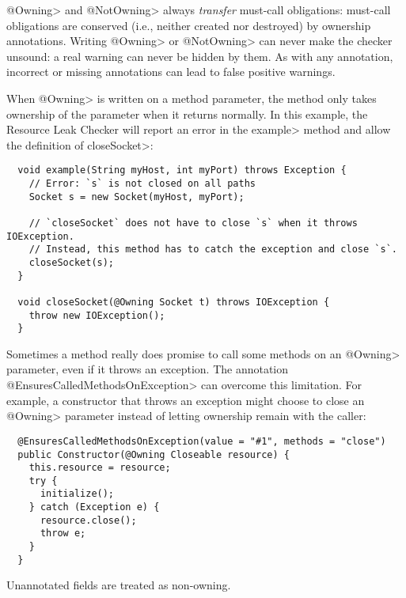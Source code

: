 \<@Owning> and \<@NotOwning> always \emph{transfer} must-call obligations: must-call
obligations are conserved (i.e., neither created nor destroyed) by ownership annotations.
Writing \<@Owning> or \<@NotOwning> can never make the checker
unsound:  a real warning can never be hidden by them.
As with any annotation, incorrect or missing annotations can lead to false positive warnings.


When \<@Owning> is written on a method parameter, the method only takes ownership of the
parameter when it returns normally.  In this example, the Resource Leak Checker will report
an error in the \<example> method and allow the definition of \<closeSocket>:

\begin{verbatim}
  void example(String myHost, int myPort) throws Exception {
    // Error: `s` is not closed on all paths
    Socket s = new Socket(myHost, myPort);

    // `closeSocket` does not have to close `s` when it throws IOException.
    // Instead, this method has to catch the exception and close `s`.
    closeSocket(s);
  }

  void closeSocket(@Owning Socket t) throws IOException {
    throw new IOException();
  }
\end{verbatim}

Sometimes a method really does promise to call some methods on an \<@Owning> parameter,
even if it throws an exception.  The annotation \<@EnsuresCalledMethodsOnException> can
overcome this limitation.  For example, a constructor that throws an exception might
choose to close an \<@Owning> parameter instead of letting ownership remain with the caller:

\begin{verbatim}
  @EnsuresCalledMethodsOnException(value = "#1", methods = "close")
  public Constructor(@Owning Closeable resource) {
    this.resource = resource;
    try {
      initialize();
    } catch (Exception e) {
      resource.close();
      throw e;
    }
  }
\end{verbatim}


Unannotated fields are treated as non-owning.

